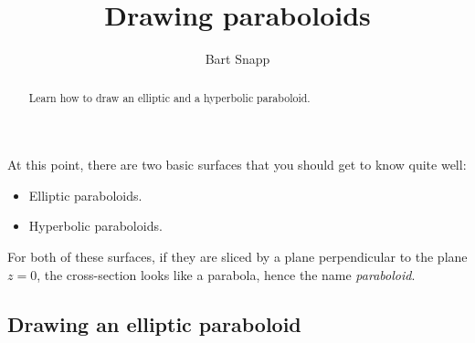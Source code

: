 \documentclass{ximera}
\author{Bart Snapp}
\title[Dig-In:]{Drawing paraboloids}
\begin{document}
\begin{abstract}
  Learn how to draw an elliptic and a hyperbolic paraboloid.
\end{abstract}
\maketitle

At this point, there are two basic surfaces that you should get to know quite well:
\begin{itemize}
\item Elliptic paraboloids.
\item Hyperbolic paraboloids.
\end{itemize}

For both of these surfaces, if they are sliced by a plane
perpendicular to the plane $z=0$, the cross-section looks like a
parabola, hence the name \textit{paraboloid}.

\subsection{Drawing an elliptic paraboloid}
\end{document}
